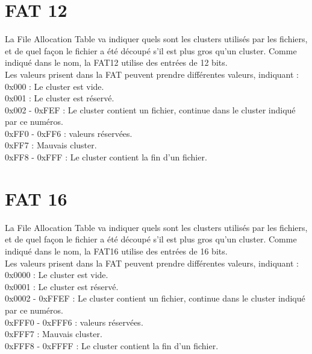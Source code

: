 \documentclass[11pt]{report}
\begin{document}
\section{FAT 12}
La File Allocation Table va indiquer quels sont les clusters utilisés par les fichiers, et de quel façon le fichier a été découpé s'il est plus gros qu'un cluster.
Comme indiqué dans le nom, la FAT12 utilise des entrées de 12 bits. \\
Les valeurs prisent dans la FAT peuvent prendre différentes valeurs, indiquant : \\
0x000 : Le cluster est vide.\\
0x001 : Le cluster est réservé.\\
0x002 - 0xFEF : Le cluster contient un fichier, continue dans le cluster indiqué par ce numéros.\\
0xFF0 - 0xFF6 : valeurs réservées.\\
0xFF7 : Mauvais cluster.\\
0xFF8 - 0xFFF : Le cluster contient la fin d'un fichier.\\
\section{FAT 16}
La File Allocation Table va indiquer quels sont les clusters utilisés par les fichiers, et de quel façon le fichier a été découpé s'il est plus gros qu'un cluster.
Comme indiqué dans le nom, la FAT16 utilise des entrées de 16 bits. \\
Les valeurs prisent dans la FAT peuvent prendre différentes valeurs, indiquant : \\
0x0000 : Le cluster est vide.\\
0x0001 : Le cluster est réservé.\\
0x0002 - 0xFFEF : Le cluster contient un fichier, continue dans le cluster indiqué par ce numéros.\\
0xFFF0 - 0xFFF6 : valeurs réservées.\\
0xFFF7 : Mauvais cluster.\\
0xFFF8 - 0xFFFF : Le cluster contient la fin d'un fichier.\\
\end{document}
